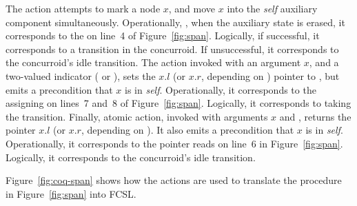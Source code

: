 The  action attempts to mark a node $x$, and move $x$
into the \emph{self} auxiliary component
simultaneously. Operationally, \ie, when the auxiliary state is
erased, it corresponds to the  on line~4 of
Figure~\ref{fig:span}. Logically, if successful, it corresponds to
a  transition in the concurroid. If
unsuccessful, it corresponds to the concurroid's idle transition.
%
The  action invoked with an argument $x$, and a
two-valued indicator  ( or ), sets
the $x.l$ (or $x.r$, depending on ) pointer to ,
but emits a precondition that $x$ is in \emph{self}.  Operationally,
it corresponds to the assigning  on lines~7 and~8 of
Figure~\ref{fig:span}. Logically, it corresponds to taking the
 transition.
%
Finally,  atomic action, invoked with arguments $x$
and , returns the pointer $x.l$ (or $x.r$, depending on
). It also emits a precondition that $x$ is in
\emph{self}. Operationally, it corresponds to the pointer reads on
line~6 in Figure~\ref{fig:span}. Logically, it corresponds to the
concurroid's idle transition.

Figure~\ref{fig:coq-span} shows how the actions are used to translate
the  procedure in Figure~\ref{fig:span} into FCSL.




